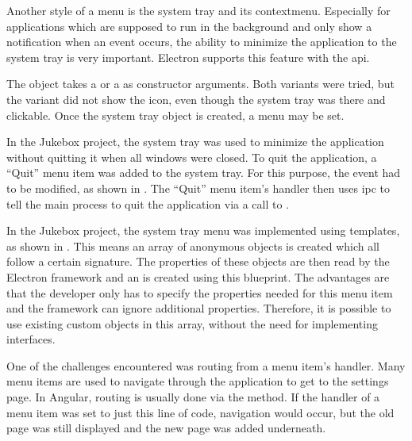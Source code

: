
Another style of a menu is the system tray and its contextmenu. Especially for applications which are supposed to run in the background and only show a notification when an event occurs, the ability to minimize the application to the system tray is very important. Electron supports this feature with the  \gls{api}.

The  object takes a  or a  as constructor arguments. Both variants were tried, but the  variant did not show the icon, even though the system tray was there and clickable. Once the system tray object is created, a menu may be set.


In the Jukebox project, the system tray was used to minimize the application without quitting it when all windows were closed. To quit the application, a \enquote{Quit} menu item was added to the system tray. For this purpose, the  event had to be modified, as shown in . The \enquote{Quit} menu item's  handler then uses \gls{ipc} to tell the main process to quit the application via a call to .


In the Jukebox project, the system tray menu was implemented using templates, as shown in . This means an array of anonymous objects is created which all follow a certain signature. The properties of these objects are then read by the Electron framework and an  is created using this blueprint. The advantages are that the developer only has to specify the properties needed for this menu item and the framework can ignore additional properties. Therefore, it is possible to use existing custom objects in this array, without the need for implementing interfaces.


One of the challenges encountered was routing from a menu item's  handler. Many menu items are used to navigate through the application \zB to get to the settings page. In Angular, routing is usually done via the  method. If the  handler of a menu item was set to just this line of code, navigation would occur, but the old page was still displayed and the new page was added underneath.

